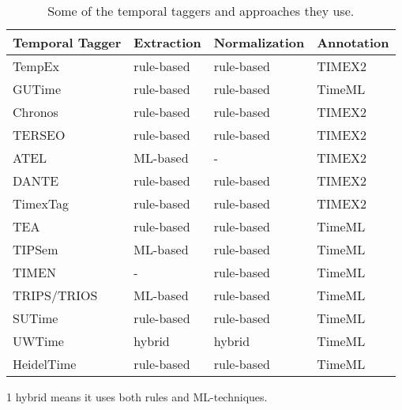 \begin{table}[H] \label{the-ttaggers-table1}
	\centering
	\begin{threeparttable}
		\begin{tabular}{||l l l l||} 
			\hline
			\textbf{Temporal Tagger} & \textbf{Extraction} & \textbf{Normalization} & \textbf{Annotation} \\ [0.5ex] 
			\hline\hline
			TempEx \cite{DBLP:conf/acl/ManiW00} & rule-based & rule-based & TIMEX2 \\ 
			GUTime \cite{DBLP:conf/acl/VerhagenMSLKJRPP05} & rule-based & rule-based & TimeML \\
			Chronos \cite{negri2004recognition} & rule-based & rule-based & TIMEX2 \\
			TERSEO \cite{DBLP:journals/dke/SaqueteMM06} & rule-based & rule-based & TIMEX2 \\
			ATEL \cite{DBLP:conf/cicling/HaciogluCD05} & ML-based & - & TIMEX2 \\
			DANTE \cite{DBLP:conf/ltconf/MazurD07} & rule-based & rule-based & TIMEX2  \\
			TimexTag \cite{DBLP:conf/dagstuhl/AhnAR05, DBLP:conf/naacl/AhnRR07} & rule-based & rule-based & TIMEX2  \\
			TEA \cite{DBLP:conf/time/HanGL06} & rule-based & rule-based & TimeML  \\
			TIPSem \cite{DBLP:conf/semeval/LlorensSN10} & ML-based & rule-based & TimeML \\
			TIMEN \cite{DBLP:conf/lrec/LlorensDGS12}  & - & rule-based & TimeML  \\
			TRIPS/TRIOS \cite{DBLP:conf/semeval/UzZamanA10} & ML-based & rule-based & TimeML  \\
			SUTime \cite{DBLP:conf/lrec/ChangM12} & rule-based & rule-based & TimeML  \\
			UWTime \cite{DBLP:conf/acl/LeeADZ14} & hybrid\tnote{1} & hybrid\tnote{1} & TimeML \\
			HeidelTime \cite{DBLP:conf/semeval/StrotgenG10} & rule-based & rule-based & TimeML  \\ [1ex]
			\hline
		\end{tabular}
	\begin{tablenotes}
		\item[1] hybrid means it uses both rules and ML-techniques.
	\end{tablenotes}
	\end{threeparttable}
	\caption{Some of the temporal taggers and approaches they use.}
	\label{table:1b}
\end{table}



